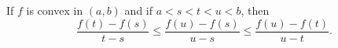 \documentclass[12pt]{article}
\begin{document}
If $f$ is convex in $(a, b)$ and if $a<s<t<u<b$, then
\begin{equation}
    \displaystyle
    \frac{f(t)-f(s)}{t-s}\leq\frac{f(u)-f(s)}{u-s}\leq\frac{f(u)-f(t)}{u-t}.
\end{equation}
\end{document}
